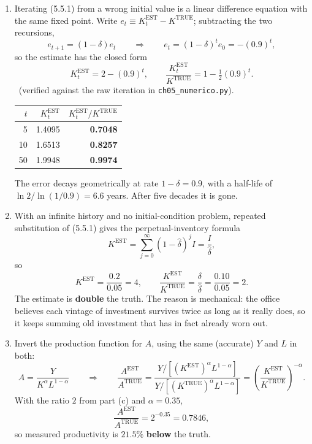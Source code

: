 \documentclass[12pt, letterpaper]{article}
\newcommand{\EST}{^{\mathrm{EST}}}
\newcommand{\TRUE}{^{\mathrm{TRUE}}}
\begin{document}
\begin{tcolorbox}[evenbox,title={Problem 5.4 \quad Measurement of the Capital Stock}]
\begin{enumerate}
\item Iterating (5.5.1) from a wrong initial value is a linear difference equation with the
same fixed point. Write $e_t\equiv K\EST_t-K\TRUE$; subtracting the two recursions,
\[
e_{t+1}=(1-\delta)e_t
\qquad\Longrightarrow\qquad
e_t=(1-\delta)^t e_0 = -(0.9)^t ,
\]
so the estimate has the closed form
\[
\boxed{K\EST_t=2-(0.9)^t},
\qquad
\frac{K\EST_t}{K\TRUE}=1-\tfrac12(0.9)^t .
\]
\checkmark\ (verified against the raw iteration in \texttt{ch05\_numerico.py}).
\begin{center}
\begin{tabular}{@{}rrr@{}}
\toprule
$t$ & $K\EST_t$ & $K\EST_t/K\TRUE$ \\
\midrule
5  & 1.4095 & \textbf{0.7048} \\
10 & 1.6513 & \textbf{0.8257} \\
50 & 1.9948 & \textbf{0.9974} \\
\bottomrule
\end{tabular}
\end{center}
The error decays geometrically at rate $1-\delta=0.9$, with a half-life of
$\ln 2/\ln(1/0.9)=6.6$ years. After five decades it is gone.

\item With an infinite history and no initial-condition problem, repeated substitution of
(5.5.1) gives the perpetual-inventory formula
\[
K\EST=\sum_{j=0}^{\infty}\left(1-\hat\delta\right)^{j}I=\frac{I}{\hat\delta},
\]
so
\[
\boxed{K\EST=\frac{0.2}{0.05}=4},
\qquad
\frac{K\EST}{K\TRUE}=\frac{\delta}{\hat\delta}=\frac{0.10}{0.05}=\boxed{2} .
\]
The estimate is \textbf{double} the truth. The reason is mechanical: the office believes
each vintage of investment survives twice as long as it really does, so it keeps summing old
investment that has in fact already worn out. \checkmark

\item Invert the production function for $A$, using the same (accurate) $Y$ and $L$ in both:
\[
A=\frac{Y}{K^{\alpha}L^{1-\alpha}}
\qquad\Longrightarrow\qquad
\frac{A\EST}{A\TRUE}
=\frac{Y/\left[(K\EST)^{\alpha}L^{1-\alpha}\right]}
      {Y/\left[(K\TRUE)^{\alpha}L^{1-\alpha}\right]}
=\boxed{\left(\frac{K\EST}{K\TRUE}\right)^{-\alpha}} .
\]
With the ratio $2$ from part (c) and $\alpha=0.35$,
\[
\frac{A\EST}{A\TRUE}=2^{-0.35}=\boxed{0.7846},
\]
so measured productivity is $21.5\%$ \textbf{below} the truth. \checkmark

\end{enumerate}


\end{tcolorbox}
\end{document}
